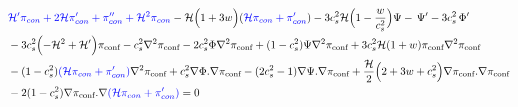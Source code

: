 \documentclass[a4paper,11pt]{article}
\begin{document}
 \begin{align} 
 &{\color{blue} \mathcal{H}' \pi_{con}+2 \mathcal{H} \pi'_{con} +\pi''_{con}+ \mathcal{H}^2 \pi_{con} }- \mathcal{H} \Big (1+ 3w \Big)({\color{blue} \mathcal{H} \pi_{con}+ \pi'_{con}}) -3 { c_s^2 \mathcal{H}}\Big( 1- \frac{w}{c_s^2} \Big )\Psi 
    - \, {\Psi'}
 - 3 c_s^2  \,{\Phi'} 
             \nonumber
   \\
    &
  -3  c_s^2 \Big({-\mathcal{H}^2 + \mathcal{H}'} \Big) \pi_{\text{conf}} 
 - c_s^2 {\nabla^2 \pi_{\text{conf}} }
     -2 c_s^2  \Phi  {\nabla^2 \pi_{\text{conf}} }  
  +   (1-c_s^2)  \Psi {\nabla^2 \pi_{\text{conf}} }
  +3 c_s^2 \mathcal{H} (1+w)\pi_{\text{conf}} {\nabla^2 \pi_{\text{conf}} }
              \nonumber
   \\
    &
        -   (1-c_s^2) { \color{blue}(\mathcal{H} \pi_{con}+ \pi'_{con})} \nabla^2 {\pi_{\text{conf}} } 
             +c_s^2 {\nabla  \Phi . \nabla \pi_{\text{conf}} }
        -(2 c_s^2-1) {\nabla  \Psi . \nabla \pi_{\text{conf}} }  
 +\frac{\mathcal{H}} {2 } \Big(2+3w+c_s^2  \Big){\nabla  \pi_{\text{conf}} . \nabla \pi_{\text{conf}} } 
                                 \nonumber
   \\
    &
     -2   (1-c_s^2){\nabla  \pi_{\text{conf}} . \nabla {\color{blue} {(\mathcal{H} \pi_{con}+ \pi'_{con})} }}       =0
  \end{align} 
\end{document}
